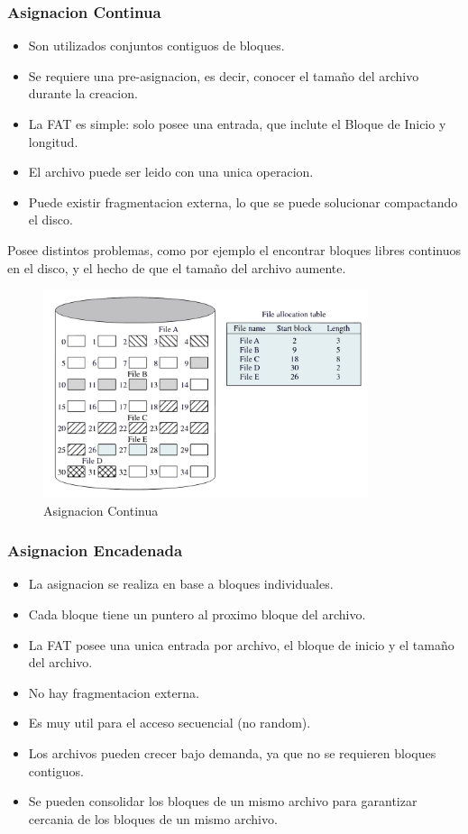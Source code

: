 \documentclass[12pt]{article}
\begin{document}
\subsubsection{Asignacion Continua}
\begin{itemize}
    \item Son utilizados conjuntos contiguos de bloques.
    \item Se requiere una pre-asignacion, es decir, conocer el tamaño del archivo durante la creacion.
    \item La FAT es simple: solo posee una entrada, que inclute el Bloque de Inicio y longitud.
    \item El archivo puede ser leido con una unica operacion.
    \item Puede existir fragmentacion externa, lo que se puede solucionar compactando el disco.
\end{itemize}
Posee distintos problemas, como por ejemplo el encontrar bloques libres continuos en el disco, y el hecho de que el tamaño del archivo aumente.
\vspace{2em}
\begin{figure}[h]
    \begin{center}
        \includegraphics[width=0.85\textwidth]{assets/AsignacionContinua.pdf}
    \end{center}
    \caption{Asignacion Continua}
    \label{fig:3}
\end{figure}

\subsubsection{Asignacion Encadenada}
\begin{itemize}
    \item La asignacion se realiza en base a bloques individuales.
    \item Cada bloque tiene un puntero al proximo bloque del archivo.
    \item La FAT posee una unica entrada por archivo, el bloque de inicio y el tamaño del archivo.
    \item No hay fragmentacion externa.
    \item Es muy util para el acceso secuencial (no random).
    \item Los archivos pueden crecer bajo demanda, ya que no se requieren bloques contiguos.
    \item Se pueden consolidar los bloques de un mismo archivo para garantizar cercania de los bloques de un mismo archivo.
\end{itemize}
\end{document}
